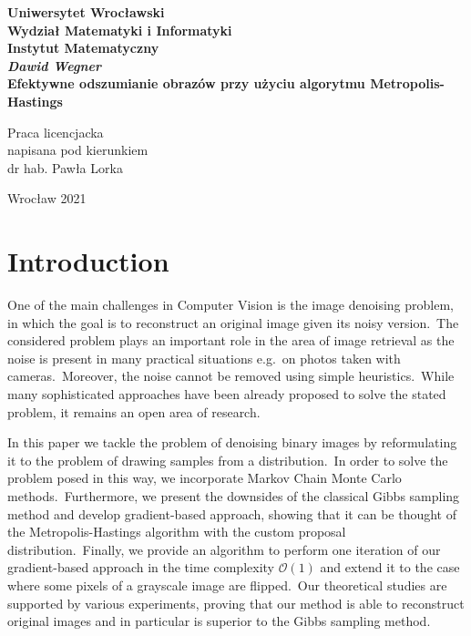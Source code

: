 \documentclass[a4paper, 11pt, onecolumn, openany, titlepage]{report}
\newcommand\blankpage{\null\thispagestyle{empty}\newpage}
\newcommand\unnumberedchapter[1]{\setlength\topskip{3cm}\chapter*{#1}\setlength\topskip{0cm}}
\theoremstyle{default_theorem_style}\newtheorem{theorem}{Theorem}
\theoremstyle{default_theorem_style}\newtheorem{definition}{Definition}
\begin{document}
\setlength\topskip{3cm}
\newpage
\thispagestyle{empty}
\begin{center}
\textbf{\large Uniwersytet Wrocławski\\
Wydział Matematyki i Informatyki\\
Instytut Matematyczny}\\
\vspace{4cm}
\textbf{\textit{\large Dawid Wegner}\\
\vspace{0.5cm}
{\Large Efektywne odszumianie obrazów przy użyciu algorytmu Metropolis-Hastings}}\\
\end{center}
\vspace{3cm}
{\large \hspace*{6.5cm}Praca licencjacka\\
\hspace*{6.5cm}napisana pod kierunkiem\\
\hspace*{6.5cm}dr hab. Pawła Lorka}\\
\vfill
\begin{center}
{\large Wrocław 2021}\\
\end{center}
\setlength\topskip{0cm}
\afterpage{\blankpage}

{\hypersetup{linkcolor=black}
\setlength\topskip{3cm}
\tableofcontents
\setlength\topskip{0cm}
}

\unnumberedchapter{Introduction}

One of the main challenges in Computer Vision is the image denoising problem, in which the goal is to reconstruct an
original image given its noisy version.\ The considered problem plays an important role in the area of image
retrieval as the noise is present in many practical situations e.g.\ on photos taken with cameras.\ Moreover, the noise
cannot be removed using simple heuristics.\ While many sophisticated approaches have been already proposed to solve
the stated problem, it remains an open area of research.\newline

In this paper we tackle the problem of denoising binary images by reformulating it to the problem of drawing samples
from a distribution.\ In order to solve the problem posed in this way, we incorporate Markov Chain Monte Carlo
methods.\ Furthermore, we present the downsides of the classical Gibbs sampling method and develop gradient-based
approach, showing that it can be thought of the Metropolis-Hastings algorithm with the custom proposal
distribution.\ Finally, we provide an algorithm to perform one iteration of our gradient-based approach in the
time complexity $\mathcal{O}(1)$ and extend it to the case where some pixels of a grayscale image are
flipped.\ Our theoretical studies are supported by various experiments, proving that our method is able to
reconstruct original images and in particular is superior to the Gibbs sampling method.
\end{document}
